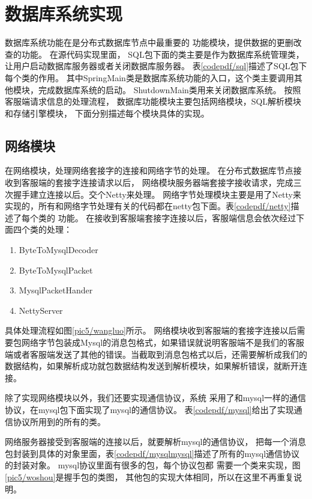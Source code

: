 \section{数据库系统实现}
数据库系统功能在是分布式数据库节点中最重要的
功能模块，提供数据的更删改查的功能。
在源代码实现里面，
SQL包下面的类主要是作为数据库系统管理类，
让用户启动数据库服务器或者关闭数据库服务器。
表\ref{codepdf/sql}描述了SQL包下每个类的作用。
其中SpringMain类是数据库系统功能的入口，这个类主要调用其他模块，完成数据库系统的启动。
ShutdownMain类用来关闭数据库系统。
按照客服端请求信息的处理流程，
数据库功能模块主要包括网络模块，SQL解析模块和存储引擎模块，
下面分别描述每个模块具体的实现。
\subsection{网络模块}
在网络模块，处理网络套接字的连接和网络字节的处理。
在分布式数据库节点接收到客服端的套接字连接请求以后，
网络模块服务器端套接字接收请求，完成三次握手建立连接以后。交个Netty来处理。
网络字节处理模块主要是用了Netty来实现的，所有和网络字节处理有关的代码都在netty包下面。表\ref{codepdf/netty}描述了每个类的
功能。
在接收到客服端套接字连接以后，客服端信息会依次经过下面四个类的处理：
\begin{enumerate}
	\item ByteToMysqlDecoder
	\item ByteToMysqlPacket
	\item MysqlPacketHander
	\item NettyServer
\end{enumerate}
具体处理流程如图\ref{pic5/wangluo}所示。
网络模块收到客服端的套接字连接以后需要包网络字节包装成Mysql的消息包格式，如果错误就说明客服端不是我们的客服端或者客服端发送了其他的错误。当截取到消息包格式以后，还需要解析成我们的数据结构，如果解析成功就包数据结构发送到解析模块，如果解析错误，就断开连接。

除了实现网络模块以外，我们还要实现通信协议，系统
采用了和mysql一样的通信协议，在mysql包下面实现了mysql的通信协议。
表\ref{codepdf/mysql}给出了实现通信协议所用到的所有的类。

网络服务器接受到客服端的连接以后，就要解析mysql的通信协议，
把每一个消息包封装到具体的对象里面，表\ref{codepdf/mysqlmysql}描述了所有的mysql通信协议的封装对象。
mysql协议里面有很多的包，每个协议包都
需要一个类来实现，图\ref{pic5/woshou}是握手包的类图，
其他包的实现大体相同，所以在这里不再重复说明。

